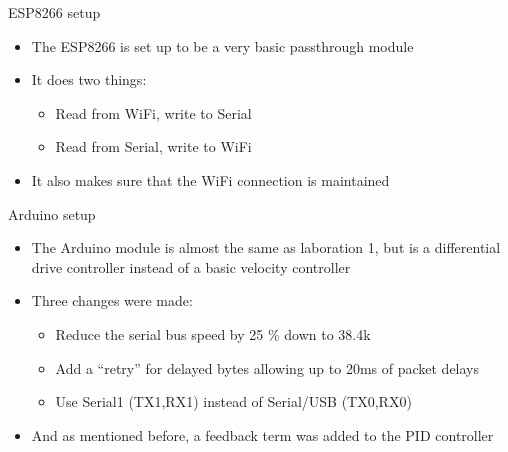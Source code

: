 \documentclass[12pt]{beamer}
\begin{document}
\begin{frame}{ESP8266 setup}
\begin{itemize}
\item<+-> The ESP8266 is set up to be a very basic passthrough module
\item<+-> It does two things:
\begin{itemize}
\item<+-> Read from WiFi, write to Serial
\item<+-> Read from Serial, write to WiFi
\end{itemize}
\item<+-> It also makes sure that the WiFi connection is maintained
\end{itemize}
\end{frame}
\begin{frame}{Arduino setup}
\begin{itemize}
\item<+-> The Arduino module is almost the same as laboration 1, but is a differential drive controller instead of a basic velocity controller
\item<+-> Three changes were made:
\begin{itemize}
\item<+-> Reduce the serial bus speed by 25 \% down to 38.4k
\item<+-> Add a ``retry'' for delayed bytes allowing up to 20ms of packet delays
\item<+-> Use Serial1 (TX1,RX1) instead of Serial/USB (TX0,RX0)
\end{itemize}
\item<+-> And as mentioned before, a feedback term was added to the PID controller
\end{itemize}
\end{frame}
\end{document}
